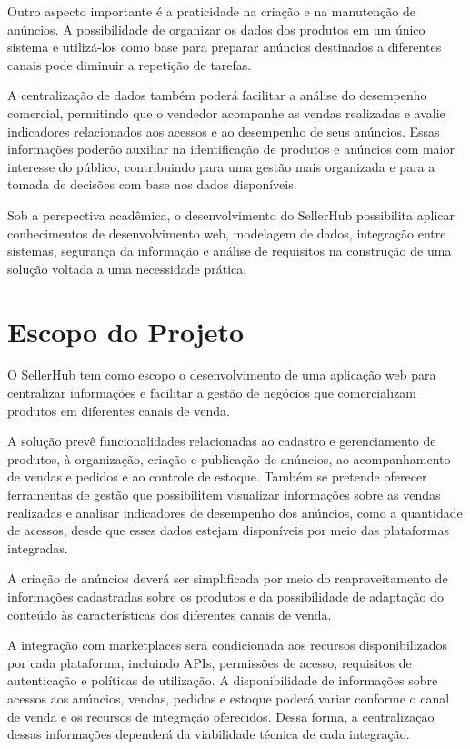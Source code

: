 Outro aspecto importante é a praticidade na criação e na manutenção de anúncios. A possibilidade de organizar os dados dos produtos em um único sistema e utilizá-los como base para preparar anúncios destinados a diferentes canais pode diminuir a repetição de tarefas.

A centralização de dados também poderá facilitar a análise do desempenho comercial, permitindo que o vendedor acompanhe as vendas realizadas e avalie indicadores relacionados aos acessos e ao desempenho de seus anúncios. Essas informações poderão auxiliar na identificação de produtos e anúncios com maior interesse do público, contribuindo para uma gestão mais organizada e para a tomada de decisões com base nos dados disponíveis.

Sob a perspectiva acadêmica, o desenvolvimento do SellerHub possibilita aplicar conhecimentos de desenvolvimento web, modelagem de dados, integração entre sistemas, segurança da informação e análise de requisitos na construção de uma solução voltada a uma necessidade prática.

\section{Escopo do Projeto}

O SellerHub tem como escopo o desenvolvimento de uma aplicação web para centralizar informações e facilitar a gestão de negócios que comercializam produtos em diferentes canais de venda.

A solução prevê funcionalidades relacionadas ao cadastro e gerenciamento de produtos, à organização, criação e publicação de anúncios, ao acompanhamento de vendas e pedidos e ao controle de estoque. Também se pretende oferecer ferramentas de gestão que possibilitem visualizar informações sobre as vendas realizadas e analisar indicadores de desempenho dos anúncios, como a quantidade de acessos, desde que esses dados estejam disponíveis por meio das plataformas integradas.

A criação de anúncios deverá ser simplificada por meio do reaproveitamento de informações cadastradas sobre os produtos e da possibilidade de adaptação do conteúdo às características dos diferentes canais de venda.

A integração com marketplaces será condicionada aos recursos disponibilizados por cada plataforma, incluindo APIs, permissões de acesso, requisitos de autenticação e políticas de utilização. A disponibilidade de informações sobre acessos aos anúncios, vendas, pedidos e estoque poderá variar conforme o canal de venda e os recursos de integração oferecidos. Dessa forma, a centralização dessas informações dependerá da viabilidade técnica de cada integração.


